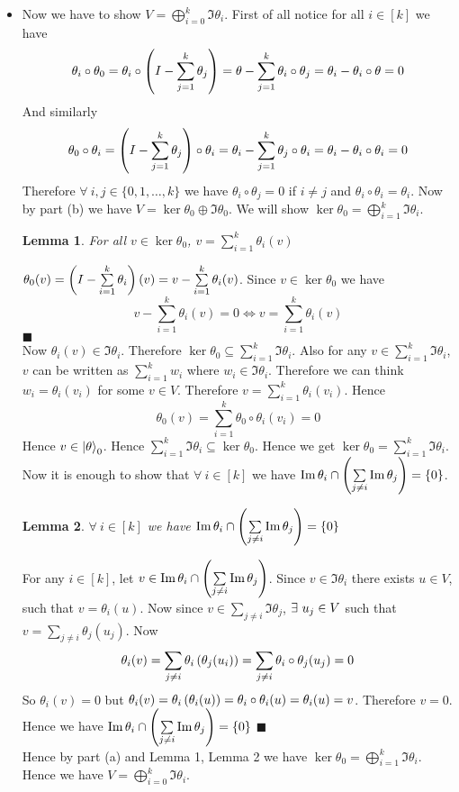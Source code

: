 \documentclass[a4paper, 11pt]{article}
\newtheorem{lemma}{Lemma}
\renewenvironment{proof}{\noindent{\it \textbf{Proof:}}\hspace*{1em}}{\hfill $\blacksquare$\bigskip\\}
\begin{document}
{\begin{itemize}
\begin{itemize}
\item 	Now we have to show $V=\bigoplus\limits_{i=0}^k\Im\theta_i$. First of all notice for all $i\in[k]$ we have $$\theta_i\circ \theta_0=\theta_i\circ\left(I-\sum\limits_{j=1}^k\theta_j\right)=\theta-\sum_{j=1}^k\theta_i\circ\theta_j=\theta_i-\theta_i\circ\theta=0$$And similarly $$\theta_0\circ \theta_i=\left(I-\sum_{j=1}^k \theta_j\right)\circ \theta_i=\theta_i-\sum_{j=1}^k \theta_j\circ\theta_i=\theta_i-\theta_i\circ\theta_i=0$$Therefore $\forall\ i,j\in\{0,1,\dots,k\}$ we have $\theta_i\circ\theta_j=0$ if $i\neq j$ and $\theta_i\circ\theta_i=\theta_i$. Now by part (b) we have $V=\ker\theta_0\oplus \Im\theta_0$. We will show $\ker\theta_0=\bigoplus\limits_{i=1}^k\Im\theta_i$.  \begin{lemma}
	For all $v\in\ker\theta_0$, $v=\sum\limits_{i=1}^k \theta_i (v)$
\end{lemma}
\begin{proof}
	$\theta_0(v)=\left(I-\sum\limits_{i=1}^k\theta_i\right)(v)=v-\sum\limits_{i=1}^k\theta_i(v)$. Since $v\in \ker\theta_0$ we have $$v-\sum\limits_{i=1}^k\theta_i(v)=0\iff v=\sum\limits_{i=1}^k\theta_i(v)$$
\end{proof}Now $\theta_i(v)\in \Im\theta_i$. Therefore $\ker\theta_0\subseteq \sum\limits_{i=1}^k \Im\theta_i$. Also for any $v\in \sum\limits_{i=1}^k \Im\theta_i$, $v$ can be written as $\sum\limits_{i=1}^kw_i$ where $w_i\in\Im\theta_i$. Therefore we can think $w_i=\theta_i(v_i)$ for some $v\in V$. Therefore $v=\sum\limits_{i=1}^k\theta_i(v_i)$. Hence $$\theta_0(v)=\sum_{i=1}^k \theta_0\circ \theta_i(v_i)=0$$Hence $v\in \ket\theta_0$. Hence $\sum\limits_{i=1}^k \Im\theta_i\subseteq \ker\theta_0$. Hence we get $\ker\theta_0=\sum\limits_{i=1}^k\Im\theta_i$. Now it is enough to show that $\forall\ i\in[k]$ we have $\Im\theta_i\cap \left(\sum\limits_{j\neq i}\Im\theta_j\right)=\{0\}$.
\begin{lemma}
	$\forall\ i\in[k]$ we have $\Im\theta_i\cap \left(\sum\limits_{j\neq i}\Im\theta_j\right)=\{0\}$
\end{lemma}
\begin{proof}
	For any $i\in[k]$, let $v\in \Im\theta_i\cap \left(\sum\limits_{j\neq i}\Im\theta_j\right)$. Since $v\in\Im\theta_i$ there exists $u\in V$, such that $v=\theta_i(u)$. Now since $v\in \sum\limits_{j\neq i}\Im\theta_j$, $\exists\ u_j\in V$ such that $v=\sum\limits_{j\neq i}\theta_j(u_j)$. Now $$\theta_i(v)=\sum\limits_{j\neq i}\theta_i\left(\theta_j(u_i)\right)= \sum\limits_{j\neq i}\theta_i\circ\theta_j(u_j)=0$$So $\theta_i(v)=0$ but $\theta_i(v)=\theta_i\left(\theta_i(u)\right)=\theta_i\circ\theta_i(u)=\theta_i(u)=v$. Therefore $v=0$. Hence we have $\Im\theta_i\cap \left(\sum\limits_{j\neq i}\Im\theta_j\right)=\{0\}$
\end{proof}
Hence by part (a) and Lemma 1, Lemma 2 we have $\ker\theta_0=\bigoplus\limits_{i=1}^k \Im\theta_i$. Hence we have $V=\bigoplus\limits_{i=0}^k\Im\theta_i$.
\end{itemize}
	\end{itemize}
}
\end{document}
